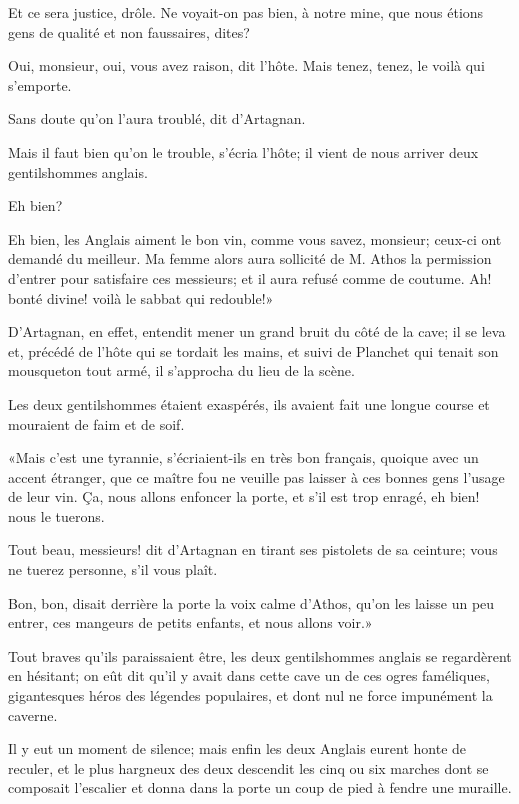 \speak  Et ce sera justice, drôle. Ne voyait-on pas bien, à notre mine, que nous étions gens de qualité et non faussaires, dites? 

\speak  Oui, monsieur, oui, vous avez raison, dit l'hôte. Mais tenez, tenez, le voilà qui s'emporte. 

\speak  Sans doute qu'on l'aura troublé, dit d'Artagnan. 

\speak  Mais il faut bien qu'on le trouble, s'écria l'hôte; il vient de nous arriver deux gentilshommes anglais. 

\speak  Eh bien? 

\speak  Eh bien, les Anglais aiment le bon vin, comme vous savez, monsieur; ceux-ci ont demandé du meilleur. Ma femme alors aura sollicité de M. Athos la permission d'entrer pour satisfaire ces messieurs; et il aura refusé comme de coutume. Ah! bonté divine! voilà le sabbat qui redouble!» 

D'Artagnan, en effet, entendit mener un grand bruit du côté de la cave; il se leva et, précédé de l'hôte qui se tordait les mains, et suivi de Planchet qui tenait son mousqueton tout armé, il s'approcha du lieu de la scène. 

Les deux gentilshommes étaient exaspérés, ils avaient fait une longue course et mouraient de faim et de soif. 

«Mais c'est une tyrannie, s'écriaient-ils en très bon français, quoique avec un accent étranger, que ce maître fou ne veuille pas laisser à ces bonnes gens l'usage de leur vin. Ça, nous allons enfoncer la porte, et s'il est trop enragé, eh bien! nous le tuerons. 

\speak  Tout beau, messieurs! dit d'Artagnan en tirant ses pistolets de sa ceinture; vous ne tuerez personne, s'il vous plaît. 

\speak  Bon, bon, disait derrière la porte la voix calme d'Athos, qu'on les laisse un peu entrer, ces mangeurs de petits enfants, et nous allons voir.» 

Tout braves qu'ils paraissaient être, les deux gentilshommes anglais se regardèrent en hésitant; on eût dit qu'il y avait dans cette cave un de ces ogres faméliques, gigantesques héros des légendes populaires, et dont nul ne force impunément la caverne. 

Il y eut un moment de silence; mais enfin les deux Anglais eurent honte de reculer, et le plus hargneux des deux descendit les cinq ou six marches dont se composait l'escalier et donna dans la porte un coup de pied à fendre une muraille. 

